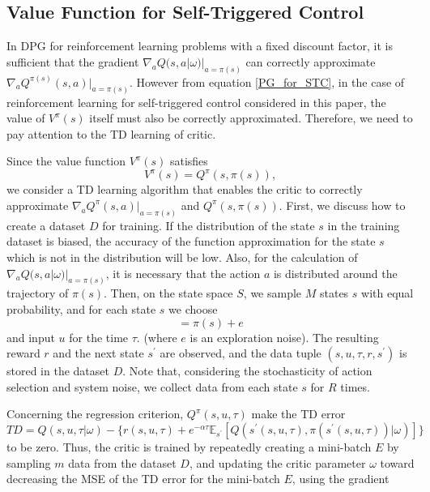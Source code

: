 \documentclass[english, dvipdfmx]{ampmt}             %
\newcommand{\expect}{\mathbb{E}}
\begin{document}
\subsection{Value Function for Self-Triggered Control}
In DPG for reinforcement learning problems with a fixed discount factor, it is sufficient that the gradient $\nabla_aQ(s,a|\omega)|_{a=\pi(s)}$ can correctly approximate $\nabla_aQ^{\pi(s)}(s,a)|_{a=\pi(s)}$. However from equation \eqref{PG_for_STC}, in the case of reinforcement learning for self-triggered control considered in this paper, the value of $V^{\pi}(s)$ itself must also be correctly approximated. Therefore, we need to pay attention to the TD learning of critic.\par
Since the value function $V^{\pi}(s)$ satisfies 
\begin{equation}
	V^{\pi}(s) = Q^{\pi}(s,\pi(s)),
\end{equation}
we consider a TD learning algorithm that enables the critic to correctly approximate $\nabla_aQ^{\pi}(s,a)|_{a=\pi(s)}$ and $Q^{\pi}(s,\pi(s))$. First, we discuss how to create a dataset $D$ for training. If the distribution of the state $s$ in the training dataset is biased, the accuracy of the function approximation for the state $s$ which is not in the distribution will be low. Also, for the calculation of $\nabla_aQ(s,a|\omega)|_{a=\pi(s)}$, it is necessary that the action $a$ is distributed around the trajectory of $\pi(s)$. Then, on the state space $S$, we sample $M$ states $s$ with equal probability, and for each state $s$ we choose 
\begin{equation}
	[u, \tau] = \pi(s) + e
\end{equation}
and input $u$ for the time $\tau$. (where $e$ is an exploration noise). The resulting reward $r$ and the next state $s^{\prime}$ are observed, and the data tuple $(s,u,\tau,r,s^{\prime})$ is stored in the dataset $D$. Note that, considering the stochasticity of action selection and system noise, we collect data from each state $s$ for $R$ times.\par
Concerning the regression criterion, $Q^{\pi}(s,u, \tau)$ make the TD error
\begin{equation}
	TD = Q(s,u,\tau|\omega) - \{r(s,u,\tau) + e^{-\alpha\tau}\expect_{s^{\prime}}[Q(s^{\prime}(s,u,\tau), \pi(s^{\prime}(s,u,\tau))|\omega)]\}
\end{equation} 
to be zero. Thus, the critic is trained by repeatedly creating a mini-batch $E$ by sampling $m$ data from the dataset $D$, and updating the critic parameter $\omega$ toward decreasing the MSE of the TD error for the mini-batch $E$, using the gradient
\end{document}
